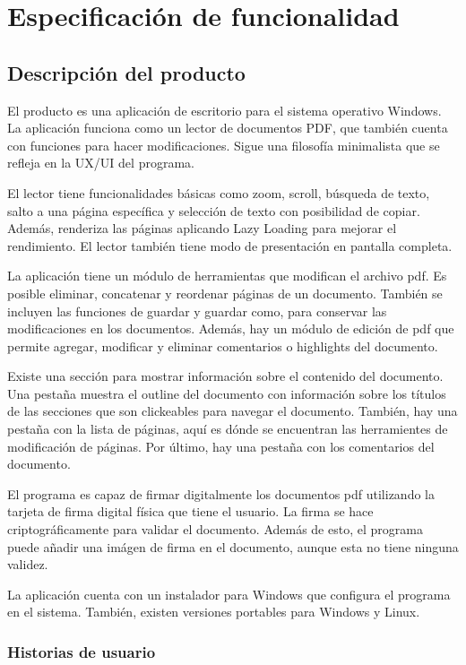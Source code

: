 \chapter{Especificación de funcionalidad}
\section{Descripción del producto}

El producto es una aplicación de escritorio para el sistema operativo Windows. La aplicación funciona como un lector de documentos PDF, que también cuenta con funciones para hacer modificaciones. Sigue una filosofía minimalista que se refleja en la UX/UI del programa.

El lector tiene funcionalidades básicas como zoom, scroll, búsqueda de texto, salto a una página específica y selección de texto con posibilidad de copiar. Además, renderiza las páginas aplicando Lazy Loading para mejorar el rendimiento. El lector también tiene modo de presentación en pantalla completa.

La aplicación tiene un módulo de herramientas que modifican el archivo pdf. Es posible eliminar, concatenar y reordenar páginas de un documento. También se incluyen las funciones de guardar y guardar como, para conservar las modificaciones en los documentos. Además, hay un módulo de edición de pdf que permite agregar, modificar y eliminar comentarios o highlights del documento.

Existe una sección para mostrar información sobre el contenido del documento. Una pestaña muestra el outline del documento con información sobre los títulos de las secciones que son clickeables para navegar el documento. También, hay una pestaña con la lista de páginas, aquí es dónde se encuentran las herramientes de modificación de páginas. Por último, hay una pestaña con los comentarios del documento.

El programa es capaz de firmar digitalmente los documentos pdf utilizando la tarjeta de firma digital física que tiene el usuario. La firma se hace criptográficamente para validar el documento. Además de esto, el programa puede añadir una imágen de firma en el documento, aunque esta no tiene ninguna validez. 

La aplicación cuenta con un instalador para Windows que configura el programa en el sistema. También, existen versiones portables para Windows y Linux.


\subsection{Historias de usuario}

